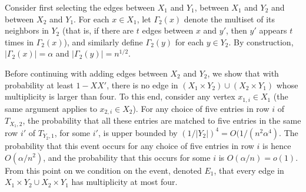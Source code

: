 \documentclass{article}
\begin{document}

Consider first selecting the edges between $X_1$ and $Y_1$, between $X_1$ and $Y_2$ and between $X_2$ and $Y_1$.
For each $x\in X_1$, let $\Gamma_2(x)$ denote the multiset of its neighbors in $Y_2$ (that is, if there are $t$ edges between $x$ and $y'$, then $y'$ appears $t$ times in $\Gamma_2(x)$), and similarly define $\Gamma_2(y)$ for each $y \in Y_2$. By construction, $|\Gamma_2(x)| = \alpha$ and $|\Gamma_2(y)| = n^{1/2}$.

Before continuing with adding edges between $X_2$ and $Y_2$, we show that with probability at least $1-XX'$, there is no edge in $(X_1\times Y_2) \cup (X_2 \times Y_1)$ whose multiplicity is larger than four. To this end, consider any vertex $x_{1,i} \in X_1$ (the same argument applies to $x_{2,i}\in X_2$). For any choice of five entries in row $i$ of $T_{X_1,2}$,
the probability that all these entries are matched to five entries
in the same row $i'$ of  $T_{Y_2,1}$, for some $i'$, is upper bounded by $(1/|Y_2|)^4 = O(1/(n^2\alpha^4)$.
The probability that this event occurs for any choice of five entries in row $i$ is hence $O(\alpha/n^2)$, and the probability that this occurs for some $i$ is $O(\alpha/n) = o(1)$.
From this point on we condition on the event, denoted $E_1$, that every edge in $X_1\times Y_2 \cup X_2 \times Y_1$ has multiplicity at most four.
\end{document}
